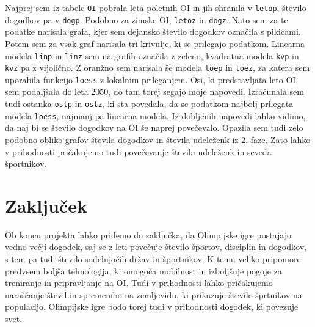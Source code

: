 \documentclass[11pt,a4paper]{article}
\begin{document}
\begin{enumerate}
{Najprej sem iz tabele \verb|OI| pobrala leta poletnih OI in jih shranila v \verb|letop|, število dogodkov pa v \verb|dogp|. Podobno za zimske OI, \verb|letoz| in \verb|dogz|. Nato sem za te podatke narisala grafa, kjer sem dejansko število dogodkov označila s pikicami. Potem sem za vsak graf narisala tri krivulje, ki se prilegajo podatkom. Linearna modela \verb|linp| in \verb|linz| sem na grafih označila z zeleno, kvadratna modela \verb|kvp| in \verb|kvz| pa z vijolično. Z oranžno sem narisala še modela \verb|loep| in \verb|loez|, za katera sem uporabila funkcijo \verb|loess| z lokalnim prileganjem. Osi, ki predstavljata leto OI, sem podaljšala do leta 2050, do tam torej segajo moje napovedi. Izračunala sem tudi ostanka \verb|ostp| in \verb|ostz|, ki sta povedala, da se podatkom najbolj prilegata modela \verb|loess|, najmanj pa linearna modela.
\newline
Iz dobljenih napovedi lahko vidimo, da naj bi se število dogodkov na OI še naprej povečevalo. Opazila sem tudi zelo podobno obliko grafov števila dogodkov in števila udeleženk iz 2. faze. Zato  lahko v prihodnosti pričakujemo tudi povečevanje števila udeleženk in seveda športnikov.
}

\end{enumerate}

\section{Zaključek}
Ob koncu projekta lahko pridemo do zaključka, da Olimpijske igre postajajo vedno večji dogodek, saj se z leti povečuje število športov, disciplin in dogodkov, s tem pa tudi število sodelujočih držav in športnikov. K temu veliko pripomore predvsem boljša tehnologija, ki omogoča mobilnost in izboljšuje pogoje za treniranje in pripravljanje na OI. Tudi v prihodnosti lahko pričakujemo naraščanje števil in spremembo na zemljevidu, ki prikazuje število šprtnikov na populacijo. Olimpijske igre bodo torej tudi v prihodnosti dogodek, ki povezuje svet.
\end{document}
